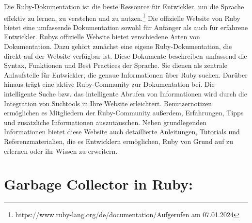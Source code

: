\documentclass{article}
\begin{document}
Die Ruby-Dokumentation ist die beste Ressource für Entwickler, um die Sprache effektiv zu lernen, zu verstehen und zu nutzen.\footnote{https://www.ruby-lang.org/de/documentation/Aufgerufen am 07.01.2024}
Die offizielle Website von Ruby bietet eine umfassende Dokumentation sowohl für Anfänger als auch für erfahrene Entwickler.
Rubys offizielle Website bietet verschiedene Arten von Dokumentation.
Dazu gehört zunächst eine eigene Ruby-Dokumentation, die direkt auf der Website verfügbar ist.
Diese Dokumente beschreiben umfassend die Syntax, Funktionen und Best Practices der Sprache.
Sie dienen als zentrale Anlaufstelle für Entwickler, die genaue Informationen über Ruby suchen.
Darüber hinaus trägt eine aktive Ruby-Community zur Dokumentation bei.
Die intelligente Suche bzw.
das intelligente Abrufen von Informationen wird durch die Integration von Suchtools in Ihre Website erleichtert.
Benutzernotizen ermöglichen es Mitgliedern der Ruby-Community außerdem, Erfahrungen, Tipps und zusätzliche Informationen auszutauschen.
Neben grundlegenden Informationen bietet diese Website auch detaillierte Anleitungen, Tutorials und Referenzmaterialien, die es Entwicklern ermöglichen, Ruby von Grund auf zu erlernen oder ihr Wissen zu erweitern.
\section*{Garbage Collector in Ruby:}
\end{document}
